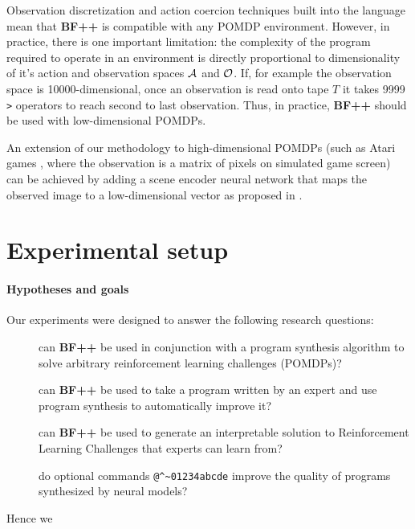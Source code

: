 Observation discretization and action coercion techniques built into the language mean that \textbf{BF++} is compatible with any POMDP environment. 
However, in practice, there is one important limitation: the complexity of the program required to operate in an environment is directly proportional to dimensionality of it's action and observation spaces $\mathcal{A}$ and $\mathcal{O}$. 
If, for example the observation space is 10000-dimensional, once an observation is read onto tape $T$ it takes 9999 \verb|>| operators to reach second to last observation.
Thus, in practice, \textbf{BF++} should be used with low-dimensional POMDPs.

An extension of our methodology to high-dimensional POMDPs (such as Atari games \cite{atari}, where the observation is a matrix of pixels on simulated game screen) can be achieved by adding a scene encoder neural network that maps the observed image to a low-dimensional vector as proposed in \cite{daqn}.

\newpage
\section{Experimental setup}
\label{sec:bfpp-experiments}

\paragraph{Hypotheses and goals}
\label{sec:exgoals}

Our experiments were designed to answer the following research questions:

\begin{description}
    \item[\rqbfpp] can \textbf{BF++} be used in conjunction with a program synthesis algorithm to solve arbitrary reinforcement learning challenges (POMDPs)?
    \item[\rqbfppexpert] can \textbf{BF++} be used to take a program written by an expert and use program synthesis to automatically improve it?
    \item[\rqbfppexplainable] can \textbf{BF++} be used to generate an interpretable solution to Reinforcement Learning Challenges that experts can learn from?
    \item[\rqbfppablation] do optional commands \verb|@^~01234abcde| improve the quality of programs synthesized by neural models?
\end{description}

Hence we

